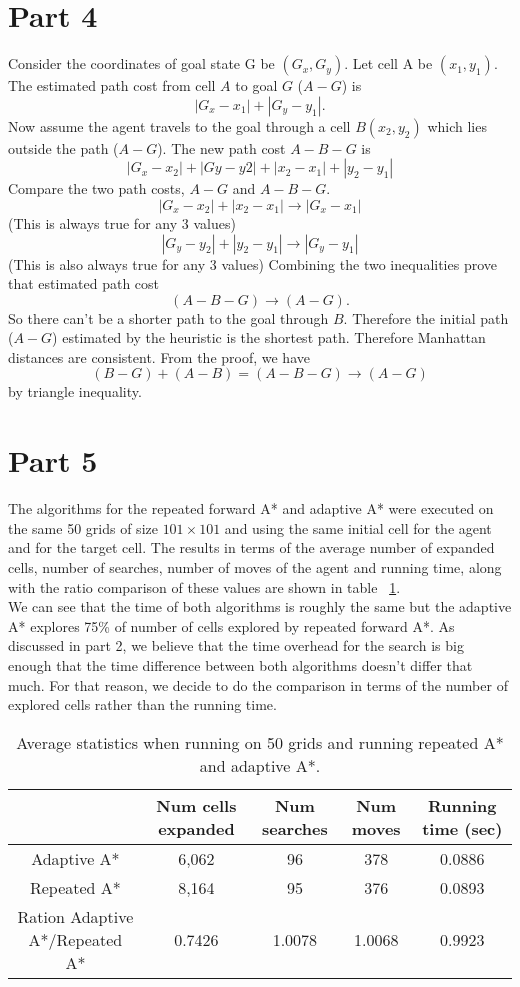 \documentclass{article}
\begin{document}
\section*{Part 4}
Consider the coordinates of goal state G be $(G_x,G_y)$. Let cell A be $(x_1,y_1)$. The estimated path cost from cell $A$ to goal $G$ ($A-G$) is $$|G_x-x_1|+|G_y-y_1|.$$ Now assume the agent travels to the goal through a cell $B (x_2,y_2)$ which lies outside the path ($A-G$). The new path cost $A-B-G$ is $$|G_x- x_2|+|Gy-y2|+|x_2-x_1|+|y_2-y_1|$$
Compare the two path costs, $A-G$ and $A-B-G$.
\\
$$|G_x-x_2|+|x_2-x_1| \rightarrow  |G_x-x_1|$$(This is always true for any 3 values) $$ |G_y-y_2|+|y_2-y_1|   \rightarrow |G_y-y_1|$$(This is also always true for any 3 values)
Combining the two inequalities prove that estimated path cost $$(A-B-G) \rightarrow (A-G). $$So there can't be a shorter path to the goal through $B$. Therefore the initial path ($A-G$) estimated by the heuristic is the shortest path. Therefore Manhattan distances are consistent.
From the proof, we have $$(B-G)+(A-B)=(A-B-G) \rightarrow (A-G)$$  by triangle inequality.

\section*{Part 5}
The algorithms for the repeated forward A* and adaptive A* were executed on the same 50 grids of size $101 \times 101$ and using the same initial cell for the agent and for the target cell. The results in terms of the average number of expanded cells, number of searches, number of moves of the agent and running time, along with the ratio comparison of these values are shown in table~ \ref{tab:adaptive}.\\
We can see that the time of both algorithms is roughly the same but the adaptive A* explores 75\% of number of cells explored by repeated forward A*. As discussed in part 2, we believe that the time overhead for the search is big enough that the time difference between both algorithms doesn't differ that much. For that reason, we decide to do the comparison in terms of the number of explored cells rather than the running time.

\begin{table}[ht]
  \begin{center}
    \begin{tabular}{|*{5}{c|}}
      \cline{2-5}
      \multicolumn{1}{c|}{} & Num cells expanded & Num searches & Num moves & Running time (sec) \\ \hline
      Adaptive A* & 6,062 & 96 & 378 & 0.0886\\ \hline 
      Repeated A*  & 8,164  & 95 & 376 & 0.0893 \\ \hline \hline
      Ration Adaptive A*/Repeated A* & 0.7426 & 1.0078 & 1.0068 & 0.9923 \\ \hline
    \end{tabular}
  \end{center}
  \caption{Average statistics when running on 50 grids and running repeated A* and adaptive A*.}
  \label{tab:adaptive}
\end{table}
\end{document}
